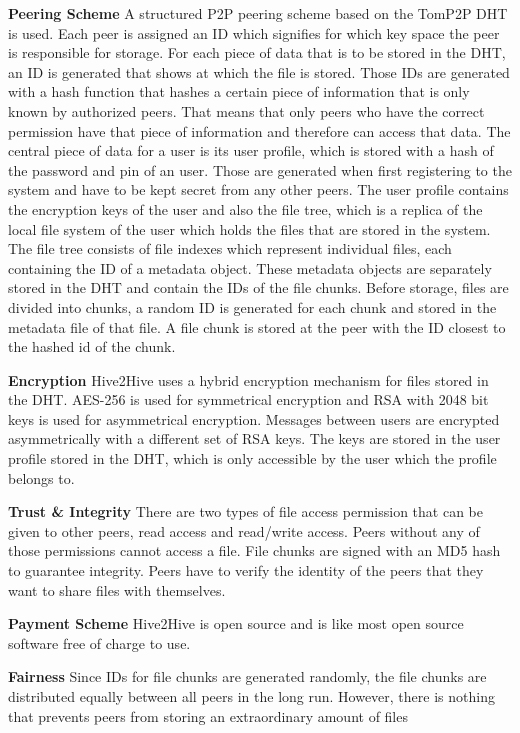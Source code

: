\textbf{Peering Scheme}
A structured P2P peering scheme based on the TomP2P DHT is used. Each peer is assigned an ID which signifies for which key space the peer is responsible for storage. For each piece of data that is to be stored in the DHT, an ID is generated that shows at which the file is stored. Those IDs are generated with a hash function that hashes a certain piece of information that is only known by authorized peers. That means that only peers who have the correct permission have that piece of information and therefore can access that data.
The central piece of data for a user is its user profile, which is stored with a hash of the password and pin of an user. Those are generated when first registering to the system and have to be kept secret from any other peers. The user profile contains the encryption keys of the user and also the file tree, which is a replica of the local file system of the user which holds the files that are stored in the system. The file tree consists of file indexes which represent individual files, each containing the ID of a metadata object. These metadata objects are separately stored in the DHT and contain the IDs of the file chunks. Before storage, files are divided into chunks, a random ID is generated for each chunk and stored in the metadata file of that file. A file chunk is stored at the peer with the ID closest to the hashed id of the chunk.

\textbf{Encryption}
Hive2Hive uses a hybrid encryption mechanism for files stored in the DHT. AES-256 is used for symmetrical encryption and RSA with 2048 bit keys is used for asymmetrical encryption. Messages between users are encrypted asymmetrically with a different set of RSA keys.
The keys are stored in the user profile stored in the DHT, which is only accessible by the user which the profile belongs to.

\textbf{Trust \& Integrity}
There are two types of file access permission that can be given to other peers, read access and read/write access. Peers without any of those permissions cannot access a file. File chunks are signed with an MD5 hash to guarantee integrity. Peers have to verify the identity of the peers that they want to share files with themselves.

\textbf{Payment Scheme}
Hive2Hive is open source and is like most open source software free of charge to use.

\textbf{Fairness}
Since IDs for file chunks are generated randomly, the file chunks are distributed equally between all peers in the long run. However, there is nothing that prevents peers from storing an extraordinary amount of files

